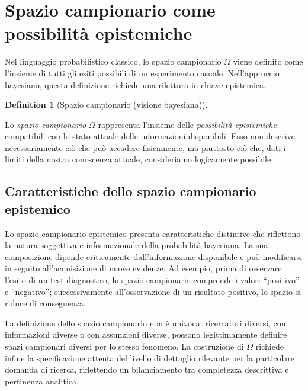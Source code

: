 \documentclass[
  letterpaper,
  DIV=11,
  numbers=noendperiod,
  oneside]{scrreprt}
\theoremstyle{definition}
\theoremstyle{plain}
\theoremstyle{definition}
\newtheorem{definition}{Definition}[chapter]
\theoremstyle{remark}
\begin{document}
\section{Spazio campionario come possibilità
epistemiche}\label{spazio-campionario-come-possibilituxe0-epistemiche}

Nel linguaggio probabilistico classico, lo spazio campionario \(\Omega\)
viene definito come l'insieme di tutti gli esiti possibili di un
esperimento casuale. Nell'approccio bayesiano, questa definizione
richiede una rilettura in chiave epistemica.

\begin{definition}[Spazio campionario (visione
bayesiana)]\protect\hypertarget{def-sample-space-bayesian}{}\label{def-sample-space-bayesian}

Lo \emph{spazio campionario} \(\Omega\) rappresenta l'insieme delle
\emph{possibilità epistemiche} compatibili con lo stato attuale delle
informazioni disponibili. Esso non descrive necessariamente ciò che può
accadere fisicamente, ma piuttosto ciò che, dati i limiti della nostra
conoscenza attuale, consideriamo logicamente possibile.

\end{definition}

\subsection{Caratteristiche dello spazio campionario
epistemico}\label{caratteristiche-dello-spazio-campionario-epistemico}

Lo spazio campionario epistemico presenta caratteristiche distintive che
riflettono la natura soggettiva e informazionale della probabilità
bayesiana. La sua composizione dipende criticamente dall'informazione
disponibile e può modificarsi in seguito all'acquisizione di nuove
evidenze. Ad esempio, prima di osservare l'esito di un test diagnostico,
lo spazio campionario comprende i valori ``positivo'' e ``negativo'';
successivamente all'osservazione di un risultato positivo, lo spazio si
riduce di conseguenza.

La definizione dello spazio campionario non è univoca: ricercatori
diversi, con informazioni diverse o con assunzioni diverse, possono
legittimamente definire spazi campionari diversi per lo stesso fenomeno.
La costruzione di \(\Omega\) richiede infine la specificazione attenta
del livello di dettaglio rilevante per la particolare domanda di
ricerca, riflettendo un bilanciamento tra completezza descrittiva e
pertinenza analitica.
\end{document}
